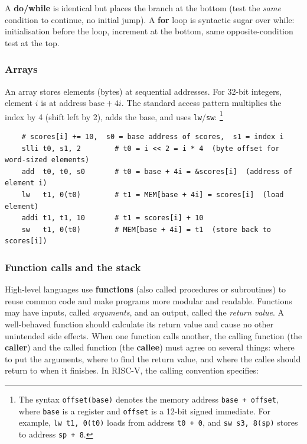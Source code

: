 \documentclass[9pt, a4paper]{extarticle}
\begin{document}
A \textbf{do/while} is identical but places the branch at the bottom (test the \emph{same} condition to continue, no initial jump). A \textbf{for} loop is syntactic sugar over while: initialisation before the loop, increment at the bottom, same opposite-condition test at the top.

\subsubsection{Arrays}

An array stores elements (bytes) at sequential addresses. For 32-bit integers, element $i$ is at address $\text{base} + 4i$. The standard access pattern multiplies the index by 4 (shift left by 2), adds the base, and uses \texttt{lw}/\texttt{sw}: \footnote{The syntax \texttt{offset(base)} denotes the memory address \texttt{base + offset}, where \texttt{base} is a register and \texttt{offset} is a 12-bit signed immediate. For example, \texttt{lw t1, 0(t0)} loads from address \texttt{t0 + 0}, and \texttt{sw s3, 8(sp)} stores to address \texttt{sp + 8}.}

\begin{verbatim}
    # scores[i] += 10,  s0 = base address of scores,  s1 = index i
    slli t0, s1, 2        # t0 = i << 2 = i * 4  (byte offset for word-sized elements)
    add  t0, t0, s0       # t0 = base + 4i = &scores[i]  (address of element i)
    lw   t1, 0(t0)        # t1 = MEM[base + 4i] = scores[i]  (load element)
    addi t1, t1, 10       # t1 = scores[i] + 10
    sw   t1, 0(t0)        # MEM[base + 4i] = t1  (store back to scores[i])
\end{verbatim}

\subsubsection{Function calls and the stack}

High-level languages use \textbf{functions} (also called procedures or subroutines) to reuse common code and make programs more modular and readable. Functions may have inputs, called \emph{arguments}, and an output, called the \emph{return value}. A well-behaved function should calculate its return value and cause no other unintended side effects. When one function calls another, the calling function (the \textbf{caller}) and the called function (the \textbf{callee}) must agree on several things: where to put the arguments, where to find the return value, and where the callee should return to when it finishes. In RISC-V, the calling convention specifies:
\end{document}
